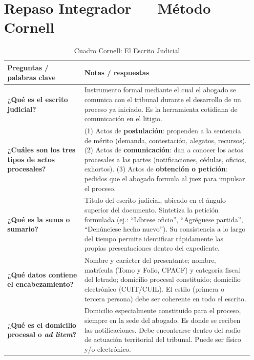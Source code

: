 \documentclass[12pt,oneside]{book}
\begin{document}
\chapter{Repaso Integrador --- Método Cornell}

\begin{table}[H]
\centering
\caption{Cuadro Cornell: El Escrito Judicial}
\begin{tabularx}{\textwidth}{
    >{\raggedright\arraybackslash}p{}
    >{\raggedright\arraybackslash}X
}
\toprule
\textbf{Preguntas / palabras clave} &
\textbf{Notas / respuestas} \\
\midrule

\textbf{¿Qué es el escrito judicial?} &
Instrumento formal mediante el cual el abogado se comunica con el tribunal durante el desarrollo de un proceso ya iniciado. Es la herramienta cotidiana de comunicación en el litigio. \\[6pt]

\textbf{¿Cuáles son los tres tipos de actos procesales?} &
(1) Actos de \textbf{postulación}: propenden a la sentencia de mérito (demanda, contestación, alegatos, recursos). (2) Actos de \textbf{comunicación}: dan a conocer los actos procesales a las partes (notificaciones, cédulas, oficios, exhortos). (3) Actos de \textbf{obtención o petición}: pedidos que el abogado formula al juez para impulsar el proceso. \\[6pt]

\textbf{¿Qué es la suma o sumario?} &
Título del escrito judicial, ubicado en el ángulo superior del documento. Sintetiza la petición formulada (ej.: ``Líbrese oficio'', ``Agréguese partida'', ``Denúnciese hecho nuevo''). Su consistencia a lo largo del tiempo permite identificar rápidamente las propias presentaciones dentro del expediente. \\[6pt]

\textbf{¿Qué datos contiene el encabezamiento?} &
Nombre y carácter del presentante; nombre, matrícula (Tomo y Folio, CPACF) y categoría fiscal del letrado; domicilio procesal constituido; domicilio electrónico (CUIT/CUIL). El estilo (primera o tercera persona) debe ser coherente en todo el escrito. \\[6pt]

\textbf{¿Qué es el domicilio procesal o \textit{ad litem}?} &
Domicilio especialmente constituido para el proceso, siempre en la sede del abogado. Es donde se reciben las notificaciones. Debe encontrarse dentro del radio de actuación territorial del tribunal. Puede ser físico y/o electrónico. \\[6pt]


\end{tabularx}
\end{table}
\end{document}
